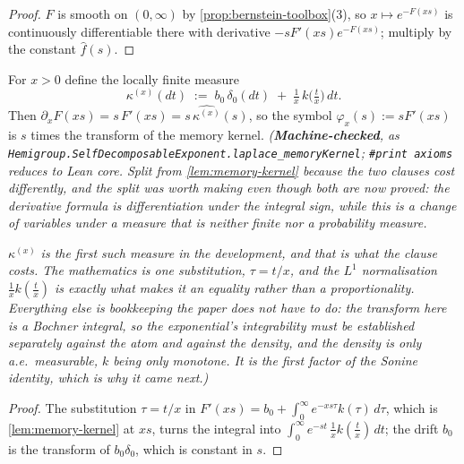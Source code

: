 \begin{proof}
$F$ is smooth on $(0,\infty)$ by \ref{prop:bernstein-toolbox}(3), so $x \mapsto e^{-F(xs)}$ is
continuously differentiable there with derivative $-sF'(xs)e^{-F(xs)}$; multiply by the
constant $\hat f(s)$.
\end{proof}

\begin{lemma}\label{lem:memory-kernel-transform}
\leanok
For $x > 0$ define the locally finite measure
\[
  \kappa^{(x)}(dt) \;:=\; b_0\,\delta_0(dt) \;+\; \tfrac{1}{x}\,k\bigl(\tfrac{t}{x}\bigr)\,dt .
\]
Then $\partial_x F(xs) = s\,F'(xs) = s\,\widehat{\kappa^{(x)}}(s)$, so the symbol
$\varphi_x(s) := s F'(xs)$ is $s$ times the transform of the memory kernel.
\statusT\quad\emph{(\textbf{Machine-checked}, as
\texttt{Hemigroup.SelfDecomposableExponent.laplace\_memoryKernel}; \texttt{\#print axioms}
reduces to Lean core. Split from \ref{lem:memory-kernel} because the two clauses cost
differently, and the split was worth making even though both are now proved: the derivative
formula is differentiation under the integral sign, while this is a change of variables under a
measure that is neither finite nor a probability measure.}

\emph{$\kappa^{(x)}$ is the first such measure in the development, and that is what the clause
costs. The mathematics is one substitution, $\tau = t/x$, and the $L^1$ normalisation
$\tfrac1x k(\tfrac{t}{x})$ is exactly what makes it an equality rather than a proportionality.
Everything else is bookkeeping the paper does not have to do: the transform here is a Bochner
integral, so the exponential's integrability must be established separately against the atom and
against the density, and the density is only \emph{a.e.}\ measurable, $k$ being only monotone.
It is the first factor of the Sonine identity, which is why it came next.)}
\end{lemma}

\begin{proof}
\leanok
The substitution $\tau = t/x$ in $F'(xs) = b_0 + \int_0^\infty e^{-xs\tau} k(\tau)\,d\tau$,
which is \ref{lem:memory-kernel} at $xs$, turns the integral into
$\int_0^\infty e^{-st}\,\tfrac{1}{x}k(\tfrac{t}{x})\,dt$; the drift $b_0$ is the transform of
$b_0\delta_0$, which is constant in $s$.
\end{proof}

